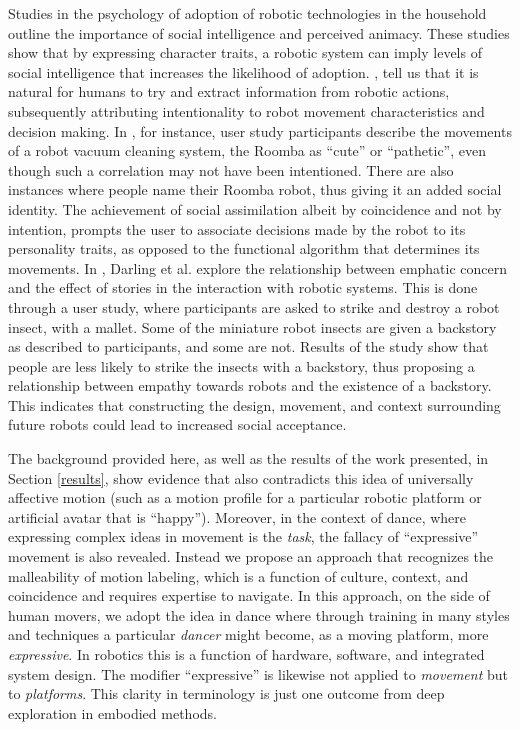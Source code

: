 \documentclass[arts,article,submit,moreauthors,pdftex,10pt,a4paper]{mdpi}
\begin{document}
Studies in the psychology of adoption of robotic technologies in the household outline the importance of social intelligence and perceived animacy. These studies show that by expressing character traits, a robotic system can imply levels of social intelligence that increases the likelihood of adoption. \cite{hendriks2011robot}, \cite{young2011evaluating} tell us that it is natural for humans to try and extract information from robotic actions, subsequently attributing intentionality to robot movement characteristics and decision making. In \cite{forlizzi2006service}, for instance, user study participants describe the movements of a robot vacuum cleaning system, the Roomba as ``cute'' or ``pathetic'', even though such a correlation may not have been intentioned. There are also instances where people name their Roomba robot, thus giving it an added social identity. The achievement of social assimilation albeit by coincidence and not by intention, prompts the user to associate decisions made by the robot to its personality traits, as opposed to the functional algorithm that determines its movements. In \cite{darling2015empathic}, Darling et al. explore the relationship between emphatic concern and the effect of stories in the interaction with robotic systems. This is done through a user study, where participants are asked to strike and destroy a robot insect, with a mallet. Some of the miniature robot insects are given a backstory as described to participants, and some are not. Results of the study show that people are less likely to strike the insects with a backstory, thus proposing a relationship between empathy towards robots and the existence of a backstory. This indicates that constructing the design, movement, and context surrounding future robots could lead to increased social acceptance.

The background provided here, as well as the results of the work presented, in Section \ref{results}, show evidence that also contradicts this idea of universally affective motion (such as a motion profile for a particular robotic platform or artificial avatar that is ``happy'').  Moreover, in the context of dance, where expressing complex ideas in movement is the \textit{task}, the fallacy of ``expressive'' movement is also revealed.  Instead we propose an approach that recognizes the malleability of motion labeling, which is a function of culture, context, and coincidence and requires expertise to navigate.  In this approach, on the side of human movers, we adopt the idea in dance where through training in many styles and techniques a particular \textit{dancer} might become, as a moving platform, more \textit{expressive}.  In robotics this is a function of hardware, software, and integrated system design.  The modifier ``expressive'' is likewise not applied to \textit{movement} but to \textit{platforms}.  This clarity in terminology is just one outcome from deep exploration in embodied methods.
\end{document}
